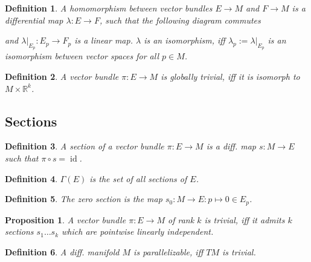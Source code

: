 \documentclass{scrartcl}
\newcommand{\R}{\mathbb R}
\newtheorem*{mydef}{Definition}
\newtheorem*{prop}{Proposition}
\begin{document}
\begin{mydef}
  A \emph{homomorphism} between vector bundles $E\rightarrow M$ and $F\rightarrow M$ is a differential map $\lambda: E\rightarrow F$, such that the following diagram commutes


  and $\lambda|_{E_p}:E_p \rightarrow F_p$ is a linear map. $\lambda$ is an \emph{isomorphism}, iff $\lambda_p:=\lambda|_{E_p}$ is an isomorphism between vector spaces for all $p \in M$.
\end{mydef}

\begin{mydef}
  A vector bundle $\pi:E\rightarrow M$ is \emph{globally trivial}, iff it is isomorph to $M\times \R^k$.
\end{mydef}

\subsection{Sections}

\begin{mydef}
  A \emph{section} of a vector bundle $\pi:E\rightarrow M$ is a diff. map $s:M\rightarrow E$ such that $\pi\circ s = \operatorname{id}$.
\end{mydef}

\begin{mydef}
  $\Gamma(E)$ is the set of all sections of $E$.
\end{mydef}

\begin{mydef}
  The zero section is the map $s_0:M\rightarrow E: p \mapsto 0\in E_p$.
\end{mydef}

\begin{prop}
  A vector bundle $\pi:E\rightarrow M$ of rank $k$ is trivial, iff it admits $k$ sections $s_1\ldots s_k$ which are pointwise linearly independent.
\end{prop}

\begin{mydef}
  A diff. manifold $M$ is \emph{parallelizable}, iff $TM$ is trivial.
\end{mydef}
\end{document}
